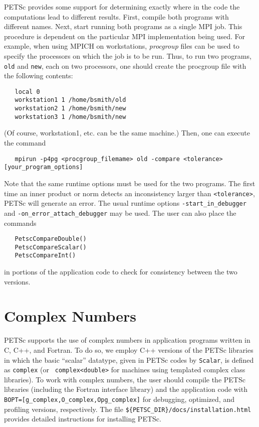 {PETSc provides some support for determining exactly where in the code
the computations lead to different results. First, compile both programs
with different names.  Next, start running
both programs as a single MPI job. This procedure is dependent on the particular
MPI implementation being used.
For example, when using MPICH on workstations, 
{\em procgroup} files can be used to specify the processors on which the job is
to be run.  Thus, to run two programs, {\tt old} and {\tt new},
each on two processors, one should create the procgroup file with the
following contents:
\begin{verbatim}
   local 0
   workstation1 1 /home/bsmith/old
   workstation2 1 /home/bsmith/new
   workstation3 1 /home/bsmith/new
\end{verbatim}
(Of course, workstation1, etc. can be the same machine.) Then, one can
execute the command
\begin{verbatim}
   mpirun -p4pg <procgroup_filemame> old -compare <tolerance> [your_program_options]
\end{verbatim}
Note that the same runtime options must be used for the two programs.
The first time an inner product or norm detects an inconsistency larger
than {\tt <tolerance>}, PETSc will generate an error. The usual runtime
options {\tt -start\_in\_debugger} and {\tt -on\_error\_attach\_debugger} may 
be used.   The user can also place the commands 
\begin{verbatim}
   PetscCompareDouble()
   PetscCompareScalar()
   PetscCompareInt()
\end{verbatim}
  
in portions of the application code to check for consistency between
the two versions.
 
\section{Complex Numbers}  \label{sec:complex}

PETSc supports the use of complex numbers in application programs
written in C, C++, and Fortran.  To do so, we employ C++ versions of
the PETSc libraries in which the basic ``scalar'' datatype, given in
PETSc codes by {\tt Scalar}, is defined as {\tt complex} (or {\tt
complex<double>} for machines using templated complex class
libraries).  To work with complex numbers,
the user should compile the PETSc libraries (including the Fortran
interface library) and the application code with
{\tt BOPT=[g\_complex,O\_complex,Opg\_complex]} for debugging, optimized,
and profiling versions, respectively.  The file {\tt \$\{PETSC\_DIR\}/docs/installation.html}
provides detailed instructions for installing PETSc.

}

